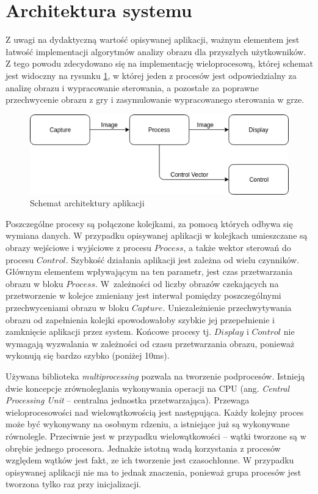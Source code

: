 \section{Architektura systemu}

Z uwagi na dydaktyczną wartość opisywanej aplikacji, ważnym elementem jest łatwość implementacji algorytmów analizy obrazu dla przyszłych użytkowników. 
Z tego powodu zdecydowano się na implementację wieloprocesową, której schemat jest widoczny na rysunku \ref{fig:arch}, w której jeden z procesów jest odpowiedzialny za analizę obrazu i wypracowanie sterowania, a pozostałe za poprawne przechwycenie obrazu z gry i zasymulowanie wypracowanego sterowania w grze. 

\begin{figure}
  \centering
  \includegraphics[width=13cm]{img/architektura.png}
  \caption{Schemat architektury aplikacji}
  \label{fig:arch}
\end{figure}

Poszczególne procesy są połączone kolejkami, za pomocą których odbywa się wymiana danych.
W przypadku opisywanej aplikacji w kolejkach umieszczane są obrazy wejściowe i wyjściowe z procesu $Process$, a także wektor sterowań do procesu $Control$. 
Szybkość działania aplikacji jest zależna od wielu czynników. 
Głównym elementem wpływającym na ten parametr, jest czas przetwarzania obrazu w bloku $Process$. 
W~zależności od liczby obrazów czekających na przetworzenie w kolejce zmieniany jest interwał pomiędzy poszczególnymi przechwyceniami obrazu w bloku $Capture$. 
Uniezależnienie przechwytywania obrazu od zapełnienia kolejki spowodowałoby szybkie jej przepełnienie i zamknięcie aplikacji przez system.  
Końcowe procesy tj. $Display$ i $Control$ nie wymagają wyzwalania w zależności od czasu przetwarzania obrazu, ponieważ wykonują się bardzo szybko (poniżej 10ms).

Używana biblioteka \textit{multiprocessing}\cite{S2} pozwala na tworzenie podprocesów. 
Istnieją dwie koncepcje zrównoleglania wykonywania operacji na CPU (ang. \textit{Central Processing Unit} -- centralna jednostka przetwarzająca). 
Przewaga wieloprocesowości nad wielowątkowością jest następująca. 
Każdy kolejny proces może być wykonywany na osobnym rdzeniu, a istniejące już są wykonywane równolegle. 
Przeciwnie jest w przypadku wielowątkowości --  wątki tworzone są w obrębie jednego procesora. Jednakże istotną wadą korzystania z procesów względem wątków jest fakt, ze ich tworzenie jest czasochłonne. 
W przypadku opisywanej aplikacji nie ma to jednak znaczenia, ponieważ grupa procesów jest tworzona tylko raz przy inicjalizacji.

